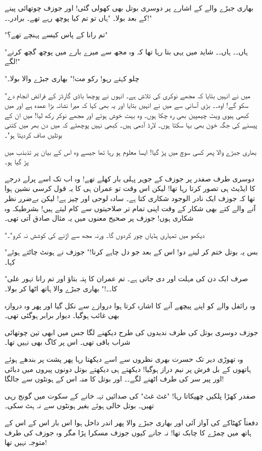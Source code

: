 بھاری جبڑے والے کے اشارے پر دوسری بوتل بھی کھولی گئی! اور جوزف چوتھائی پینے کے بعد بولا۔ "ہاں تو تم کیا پوچھ رہے تھے۔ برادر۔۔!"

"تم رانا کے پاس کیسے پہنچے تھے؟"

"ہاں۔۔ ہاں۔۔ شاید میں یہی بتا رہا تھا کہ وہ مجھ سے میرے بارے میں پوچھ گچھ کرنے لگے!"

"چلو کہتے رہو! رکو مت!" بھاری جبڑے والا بولا۔

"میں نے انہیں بتایا کہ مجھے نوکری کی تلاش ہے۔ انہوں نے پوچھا باڈی گارڈز کے فرائض انجام دے سکو گے! اوہ۔۔ بڑی آسانی سے میں نے انہیں بتایا اور یہ بھی کہا کہ میرا نشانہ بڑا عمدہ ہے اور میں کبھی ہیوی ویٹ چیمپین بھی رہ چکا ہوں۔ وہ بہت خوش ہوئے اور مجھے نوکر رکھ لیا! میں ان کے پیسنے کی جگہ خون بھی بہا سکتا ہوں۔ لارڈ آدمی ہیں۔ کبھی نہیں پوچھتے کہ میں دن بھر میں کتنی بوتلیں صاف کردیتا ہو"۔

بھاری جبڑے والا پھر کسی سوچ میں پڑ گیا! ایسا معلوم ہو رہا تھا جیسے وہ اس کے بیان پر تذبذب میں پڑ گیا ہو۔

دوسری طرف صفدر پر جوزف کے جوہر پہلی بار کھلے تھے! وہ اب تک اسے پرلے درجے کا ایڈیٹ ہی تصور کرتا رہا تھا! لیکن اس وقت تو عمران ہی کا یہ قول کرسی نشین ہوا تھا کہ جوزف ایک نادر الوجود شکاری کتا ہے۔ سادہ لوحی اور چیز ہے! لیکن بےضرر نظر آنے والے کتے بھی شکار کے وقت اپنی تمام تر صلاحیتوں سے کام لیتے ہیں! بشرطیکہ وہ شکاری ہوں! جوزف پر صحیح معنوں میں یہ مثال صادق آتی تھی۔

"دیکھو میں تمہاری ہڈیاں چور کردوں گا۔ ورنہ مجھ سے اڑنے کی کوشش نہ کرو"۔

"بس یہ بوتل ختم کر لینے دو! اس کے بعد جو دل چاہے کرنا!" جوزف نے ہونٹ چاٹتے ہوئے کہا۔

"صرف ایک دن کی مہلت اور دی جاتی ہے۔ تم عمران کا پتہ بتاؤ اور تم رانا تہور علی کا۔۔!" بھاری جبڑے والا ہاتھ اٹھا کر بولا۔

وہ رائفل والے کو اپنے پیچھے آنے کا اشارہ کرتا ہوا دروازے سے نکل گیا اور پھر وہ دروازہ بھی غائب ہوگیا۔ دیوار برابر ہوگئی تھی۔

جوزف دوسری بوتل کی طرف ندیدوں کی طرح دیکھنے لگا جس میں ابھی تین چوتھائی شراب باقی تھی۔ اس پر کاگ بھی نہیں تھا۔

وہ تھوڑی دیر تک حسرت بھری نظروں سے اسے دیکھتا رہا پھر پشت پر بندھے ہوئے ہاتھوں کے بل فرش پر نیم دراز ہوگیا! دیکھتے ہی دیکھتے بوتل دونوں پیروں میں دبائی اور پیر سر کی طرف اٹھنے لگے۔۔ اور بوتل کا منہ اس کے ہونٹوں سے جالگا!

صفدر کھڑا پلکیں چھپکاتا رہا! "غٹ غٹ" کی صدائیں تہہ خانے کے سکوت میں گونج رہی تھیں۔ بوتل خالی ہوئے بغیر ہونٹوں سے نہ ہٹ سکی۔

دفعتاً کھٹاکے کی آواز آئی اور بھاری جبڑے والا پھر اندر داخل ہوا اس بار اس کے اس کے ہاتھ میں چمڑے کا چابک تھا! نہ جانے کیوں جوزف مسکرا پڑا مگر وہ جوزف کی طرف متوجہ نہیں تھا!


